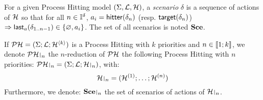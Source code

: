 \begin{definition}
\label{def:scenario}
  For a given Process Hitting model $(\Sigma,\mathcal{L},\mathcal{H})$,
  a \emph{scenario} $\delta$ is a sequence of actions of $\mathcal{H}$ so that for all $n \in \mathbb{I}^{\delta}$,
  $a_i = \mathsf{hitter}(\delta_n)$ (resp. $\mathsf{target}(\delta_n)$) $\Rightarrow \mathsf{last}_a(\delta_{1..n-1}) \in \{ \varnothing, a_i \}$.
  The set of all scenarios is noted $\mathbf{Sce}$.
\end{definition}

\begin{definition} 
  If $\mathcal{PH} = (\Sigma; \mathcal{L}; \mathcal{H}^{\langle k \rangle})$ is a Process Hitting with $k$ priorities and $n \in \llbracket 1; k \rrbracket$, we denote $\restriction{\PH}{n}$  the $n$-reduction of $\mathcal{PH}$ the following Process Hitting with $n$ priorities:
  $\restriction{\PH}{n} = (\PHs; \PHl; \restriction{\PHa}{n})$,
  with:
  $$\restriction{\PHa}{n} = (\PHa^{(1)}; \dots; \PHa^{(n)})$$
  Furthermore, we denote: $\restriction{\Sce}{n}$ the set of scenarios of actions of $\restriction{\PHa}{n}$.
%  
\end{definition}

